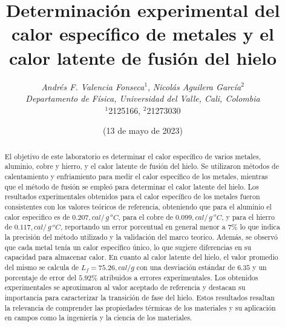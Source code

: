 \documentclass[10pt]{article}
\title{
    \textbf Determinación experimental del calor específico de metales y el calor latente de fusión del hielo
}
\author{
    \normalsize{
        \emph{Andrés F. Valencia Fonseca}$^{1}$,
        \emph{Nicolás Aguilera García}$^{2}$
    } \\
    \normalsize{
        \emph{Departamento de Física, Universidad del Valle, Cali, Colombia}
    } \\
    \small{$^{1}$2125166, $^{2}$21273030}
}
\date{(\small 13 de mayo de 2023)}
\begin{document}
\maketitle
\begin{abstract}
    El objetivo de este laboratorio es determinar el calor
    específico de varios metales, aluminio, cobre y hierro, y el calor latente de fusión del hielo. Se utilizaron
    métodos de calentamiento y enfriamiento para medir el calor específico de los
    metales, mientras que el método de fusión se empleó para determinar el calor latente del hielo.
    Los resultados experimentales obtenidos para el calor específico de los metales
    fueron consistentes con los valores teóricos de referencia, obteniendo que para el aluminio el calor especifico es
    de  $0.207 , cal/\,g\,^oC$, para el cobre de $0.099 , cal/\,g\,^oC$, y para el
    hierro de $0.117 , cal/\,g\,^oC$, reportando un error porcentual
    en general menor a $7\%$ lo que indica la precisión del método utilizado y la validación
    del marco teorico. Además, se observó que cada metal tenía un
    calor específico único, lo que sugiere diferencias en su capacidad para
    almacenar calor.
    En cuanto al calor latente del hielo, el valor promedio del mismo se calcula
    de $L_f = 75.26 , cal / g$ con una desviación estándar de $6.35$ y un
    porcentaje de error del $5.92 \%$ atribuidos a
    errores experimentales. Los obtenidos experimentales se
    aproximaron al valor aceptado de referencia y destacan su importancia para
    caracterizar la transición de fase del hielo. Estos resultados resaltan la relevancia
    de comprender las propiedades térmicas de los materiales y su aplicación en campos
    como la ingeniería y la ciencia de los materiales.
\end{abstract}
\end{document}
